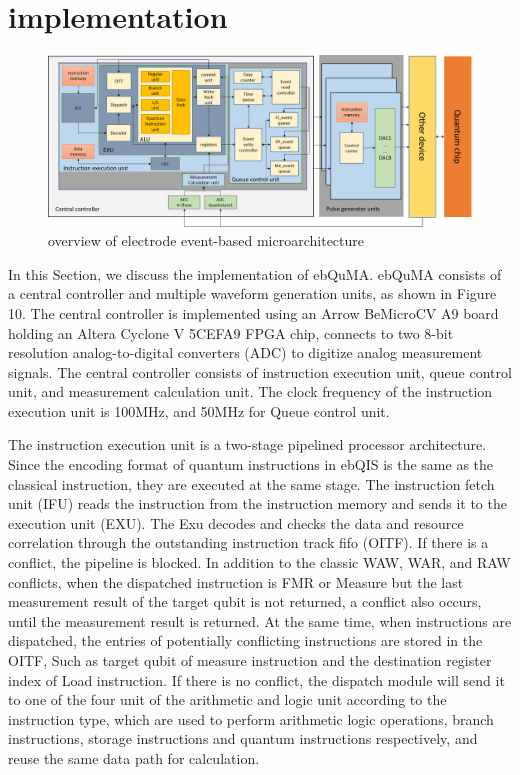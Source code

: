 \section{implementation}
\begin{figure}[ht]
  \centering
  \includegraphics[width=\linewidth]{figure/5_1}
  \caption{overview of electrode event-based microarchitecture}
  \label{img7}
\end{figure}
In this Section, we discuss the implementation of ebQuMA. ebQuMA consists of a central controller and multiple waveform generation units, 
as shown in Figure 10. The central controller is implemented using an Arrow BeMicroCV A9 board holding an Altera Cyclone V 5CEFA9 FPGA chip, 
connects to two 8-bit resolution analog-to-digital converters (ADC) to digitize analog measurement signals. 
The central controller consists of instruction execution unit, queue control unit, and measurement calculation unit. 
The clock frequency of the instruction execution unit is 100MHz, and 50MHz for Queue control unit.

The instruction execution unit is a two-stage pipelined processor architecture. 
Since the encoding format of quantum instructions in ebQIS is the same as the classical instruction, 
they are executed at the same stage. The instruction fetch unit (IFU) reads the instruction from the instruction memory and sends it to the execution unit (EXU). 
The Exu decodes and checks the data and resource correlation through the outstanding instruction track fifo (OITF). If there is a conflict, the pipeline is blocked. 
In addition to the classic WAW, WAR, and RAW conflicts, when the dispatched instruction is FMR or Measure but the last measurement result of the target qubit is not returned, 
a conflict also occurs, until the measurement result is returned. At the same time, when instructions are dispatched, 
the entries of potentially conflicting instructions are stored in the OITF, 
Such as target qubit of measure instruction and the destination register index of Load instruction.
If there is no conflict, the dispatch module will send it to one of the four unit of the arithmetic and logic unit according to the instruction type, 
which are used to perform arithmetic logic operations, branch instructions, storage instructions and quantum instructions respectively, 
and reuse the same data path for calculation.

